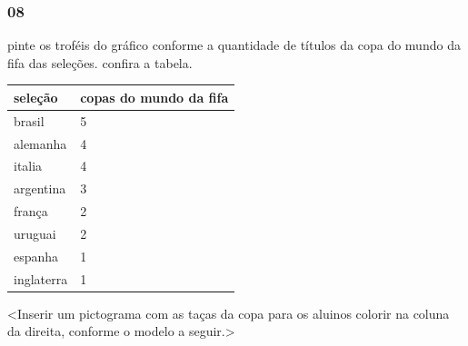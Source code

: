 \subsubsection{08}\label{section-83}

pinte os troféis do gráfico conforme a quantidade de títulos da copa do
mundo da fifa das seleções. confira a tabela.

\begin{longtable}[]{@{}ll@{}}
\toprule
seleção & copas do mundo da fifa\tabularnewline
\midrule
\endhead
brasil & 5\tabularnewline
alemanha & 4\tabularnewline
italia & 4\tabularnewline
argentina & 3\tabularnewline
frança & 2\tabularnewline
uruguai & 2\tabularnewline
espanha & 1\tabularnewline
inglaterra & 1\tabularnewline
\bottomrule
\end{longtable}

\textless{}Inserir um pictograma com as taças da copa para os aluinos
colorir na coluna da direita, conforme o modelo a seguir.\textgreater{}

